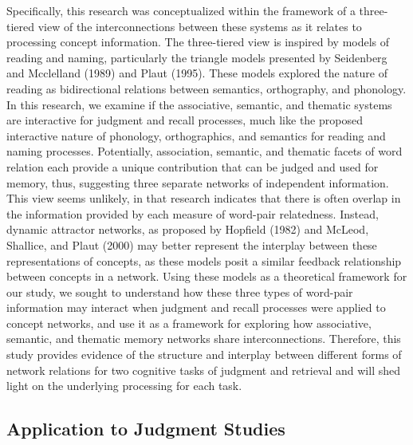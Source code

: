\documentclass[english,man]{apa6}
\theoremstyle{definition}
\theoremstyle{definition}
\theoremstyle{definition}
\theoremstyle{remark}
\begin{document}
Specifically, this research was conceptualized within the framework of a
three-tiered view of the interconnections between these systems as it
relates to processing concept information. The three-tiered view is
inspired by models of reading and naming, particularly the triangle
models presented by Seidenberg and Mcclelland (1989) and Plaut (1995).
These models explored the nature of reading as bidirectional relations
between semantics, orthography, and phonology. In this research, we
examine if the associative, semantic, and thematic systems are
interactive for judgment and recall processes, much like the proposed
interactive nature of phonology, orthographics, and semantics for
reading and naming processes. Potentially, association, semantic, and
thematic facets of word relation each provide a unique contribution that
can be judged and used for memory, thus, suggesting three separate
networks of independent information. This view seems unlikely, in that
research indicates that there is often overlap in the information
provided by each measure of word-pair relatedness. Instead, dynamic
attractor networks, as proposed by Hopfield (1982) and McLeod, Shallice,
and Plaut (2000) may better represent the interplay between these
representations of concepts, as these models posit a similar feedback
relationship between concepts in a network. Using these models as a
theoretical framework for our study, we sought to understand how these
three types of word-pair information may interact when judgment and
recall processes were applied to concept networks, and use it as a
framework for exploring how associative, semantic, and thematic memory
networks share interconnections. Therefore, this study provides evidence
of the structure and interplay between different forms of network
relations for two cognitive tasks of judgment and retrieval and will
shed light on the underlying processing for each task.

\subsection{Application to Judgment
Studies}\label{application-to-judgment-studies}
\end{document}
